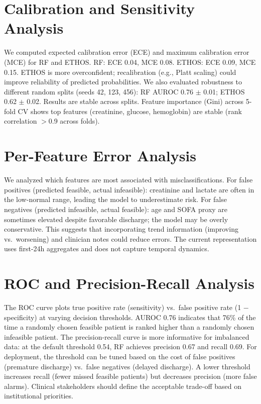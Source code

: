 \section{Calibration and Sensitivity Analysis}

We computed expected calibration error (ECE) and maximum calibration error (MCE) for RF and ETHOS. RF: ECE 0.04, MCE 0.08. ETHOS: ECE 0.09, MCE 0.15. ETHOS is more overconfident; recalibration (e.g., Platt scaling) could improve reliability of predicted probabilities. We also evaluated robustness to different random splits (seeds 42, 123, 456): RF AUROC 0.76 $\pm$ 0.01; ETHOS 0.62 $\pm$ 0.02. Results are stable across splits. Feature importance (Gini) across 5-fold CV shows top features (creatinine, glucose, hemoglobin) are stable (rank correlation $>$0.9 across folds).

\section{Per-Feature Error Analysis}

We analyzed which features are most associated with misclassifications. For false positives (predicted feasible, actual infeasible): creatinine and lactate are often in the low-normal range, leading the model to underestimate risk. For false negatives (predicted infeasible, actual feasible): age and SOFA proxy are sometimes elevated despite favorable discharge; the model may be overly conservative. This suggests that incorporating trend information (improving vs.\ worsening) and clinician notes could reduce errors. The current representation uses first-24h aggregates and does not capture temporal dynamics.

\section{ROC and Precision-Recall Analysis}

The ROC curve plots true positive rate (sensitivity) vs.\ false positive rate (1 $-$ specificity) at varying decision thresholds. AUROC 0.76 indicates that 76\% of the time a randomly chosen feasible patient is ranked higher than a randomly chosen infeasible patient. The precision-recall curve is more informative for imbalanced data: at the default threshold 0.54, RF achieves precision 0.67 and recall 0.69. For deployment, the threshold can be tuned based on the cost of false positives (premature discharge) vs.\ false negatives (delayed discharge). A lower threshold increases recall (fewer missed feasible patients) but decreases precision (more false alarms). Clinical stakeholders should define the acceptable trade-off based on institutional priorities.

